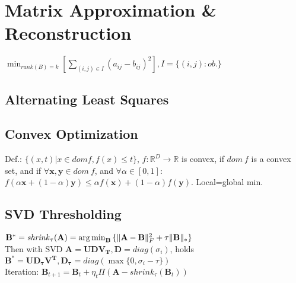 \section{Matrix Approximation \& Reconstruction}

$\min_{rank(B)=k}[\sum_{(i,j)\in I}{(a_{ij}-b_{ij})^2}], I=\{(i,j): \mathit{ob.}\}$
\subsection*{Alternating Least Squares}
\vspace{50mm}

\subsection*{Convex Optimization}
Def.: $\{(x,t)|x \in dom f, f(x) \leq t\}$, $f : \mathbb{R}^D \rightarrow \mathbb{R}$ is convex, if $dom\ f$ is a convex set, and if $\forall \mathbf{x}, \mathbf{y} \in dom\ f$, and $\forall \alpha\in[0,1]$: $f(\alpha \mathbf{x} + (1 - \alpha)\mathbf{y}) \leq \alpha f(\mathbf{x}) + (1-\alpha)f(\mathbf{y})$. Local=global min.

\subsection*{SVD Thresholding}
$\mathbf{B}^{*}=\mathit{shrink}_\tau(\mathbf{A})=\operatorname*{arg\,min}_{\mathbf{B}}{\{\|\mathbf{A-B}\|^2_F + \tau\|\mathbf{B}\|_{*}\}}$\\
Then with SVD $\mathbf{A=UDV_T}, \mathbf{D}=\mathit{diag}(\sigma_i)$, holds $\mathbf{B^*=UD_\tau V^T, D_\tau} = \mathit{diag}(\max\{0,\sigma_i - \tau\})$ \\
Iteration: $\mathbf{B}_{t+1}=\mathbf{B}_t + \eta_t \Pi(\mathbf{A} - \mathit{shrink}_\tau(\mathbf{B}_t))$
